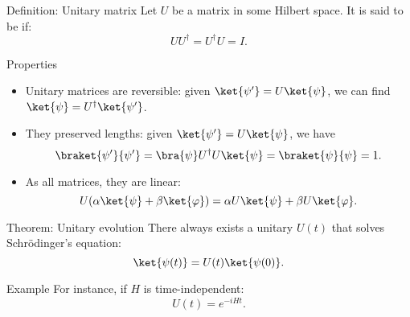 \documentclass[a4paper]{article}
\begin{document}
\begin{parag}{Definition: Unitary matrix}
    Let $U$ be a matrix in some Hilbert space. It is said to be  if: 
    \[U U^{\dagger} = U^{\dagger} U = I.\]

    \begin{subparag}{Properties}
        \begin{itemize}[left=0pt]
            \item Unitary matrices are reversible: given $\ket{\psi'} = U\ket{\psi}$, we can find $\ket{\psi} = U^{\dagger} \ket{\psi'}$.
            \item They preserved lengths: given $\ket{\psi'} = U \ket{\psi}$, we have
            \[\braket{\psi'}{\psi'} = \bra{\psi} U^{\dagger} U \ket{\psi} = \braket{\psi}{\psi} = 1.\]
            \item As all matrices, they are linear:
            \[U \left(\alpha \ket{\psi} + \beta \ket{\phi}\right) = \alpha U \ket{\psi} + \beta U \ket{\phi}.\]
        \end{itemize}
    \end{subparag}
\end{parag}

\begin{parag}{Theorem: Unitary evolution}
    There always exists a unitary $U\left(t\right)$ that solves Schrödinger's equation: 
    \[\ket{\psi\left(t\right)} = U\left(t\right) \ket{\psi\left(0\right)}.\]

    \begin{subparag}{Example}
        For instance, if $H$ is time-independent:
        \[U\left(t\right) = e^{-i H t}.\]
    \end{subparag}
\end{parag}
\end{document}
